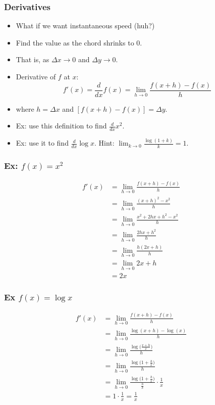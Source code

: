 \documentclass[xcolor=dvipsnames]{beamer} %
\begin{document}
\begin{frame}
\frametitle{Derivatives}
\begin{itemize}
\item What if we want \textcolor{dark_red}{instantaneous speed} (huh?)
\item Find the value as the chord shrinks to $0$.
\item That is, as $\Delta x \rightarrow 0$ and $\Delta y \rightarrow 0$. 
\item Derivative of $f$ at $x$: $$ f'(x) = \frac{d}{dx} f(x) = \lim_{h \rightarrow 0} \frac{f(x +h) - f(x)}{h} $$
\item[] where $h = \Delta x$ and $[f( x + h) - f(x)] = \Delta y$.
\item Ex: use this definition to find $\frac{d}{dx} x^2$. %
\item Ex: use it to find $\frac{d}{dx} \log x$. Hint: $\lim_{k \rightarrow 0} \frac{ \log (1+k)}{k} =1$.
\end{itemize}
\end{frame}

\begin{frame}
\frametitle{Ex: $f(x) = x^2$}
\begin{align*}
f'(x) 
&= \lim_{h \rightarrow 0} \frac{f(x +h) - f(x)}{h} \\
&= \lim_{h \rightarrow 0} \frac{(x+h)^2 - x^2}{h} \\
&= \lim_{h \rightarrow 0} \frac{x^2 + 2hx + h^2 - x^2}{h} \\
&= \lim_{h \rightarrow 0} \frac{2hx + h^2}{h} \\
&= \lim_{h \rightarrow 0} \frac{h(2x + h)}{h} \\ 
&= \lim_{h \rightarrow 0} 2x + h \\
&= 2x
\end{align*}
\end{frame}

\begin{frame}
\frametitle{Ex $f(x) = \log x$}
\begin{align*}
f'(x) 
&= \lim_{h \rightarrow 0} \frac{f(x +h) - f(x)}{h} \\
&= \lim_{h \rightarrow 0} \frac{\log (x+h) - \log (x)}{h}\\ 
&= \lim_{h \rightarrow 0} \frac{\log \bigg( \frac{x + h}{x} \bigg)  }{h} \\
&= \lim_{h \rightarrow 0} \frac{ \log \bigg( 1 + \frac{h}{x} \bigg) }{h} \\
&= \lim_{ h \rightarrow 0} \frac{ \log \bigg( 1 + \frac{h}{x} \bigg) }{\frac{h}{x}} \cdot \frac{1}{x} \\ 
&= 1 \cdot \frac{1}{x} = \frac{1}{x}
\end{align*}
\end{frame}
\end{document}
